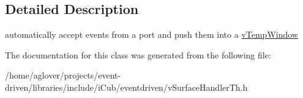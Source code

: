 \subsection{Detailed Description}
automatically accept events from a port and push them into a \hyperlink{classev_1_1vTempWindow}{v\+Temp\+Window} 

The documentation for this class was generated from the following file\+:\begin{DoxyCompactItemize}
\item 
/home/aglover/projects/event-\/driven/libraries/include/i\+Cub/eventdriven/v\+Surface\+Handler\+Th.\+h\end{DoxyCompactItemize}
